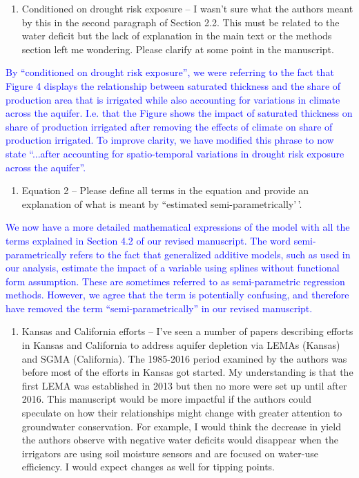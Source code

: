 \documentclass[
]{article}
\providecommand{\tightlist}{%
  \setlength{\itemsep}{0pt}\setlength{\parskip}{0pt}}
\begin{document}
\begin{enumerate}
\def\labelenumi{\arabic{enumi}.}
\setcounter{enumi}{2}
\tightlist
\item
  Conditioned on drought risk exposure -- I wasn't sure what the authors
  meant by this in the second paragraph of Section 2.2. This must be
  related to the water deficit but the lack of explanation in the main
  text or the methods section left me wondering. Please clarify at some
  point in the manuscript.
\end{enumerate}

\textcolor{blue}{By ``conditioned on drought risk exposure'', we were referring to the fact that Figure 4 displays the relationship between saturated thickness and the share of production area that is irrigated while also accounting for variations in climate across the aquifer. I.e. that the Figure shows the impact of saturated thickness on share of production irrigated after removing the effects of climate on share of production irrigated. To improve clarity, we have modified this phrase to now state ``...after accounting for spatio-temporal variations in drought risk exposure across the aquifer''.}

\begin{enumerate}
\def\labelenumi{\arabic{enumi}.}
\setcounter{enumi}{3}
\tightlist
\item
  Equation 2 -- Please define all terms in the equation and provide an
  explanation of what is meant by ``estimated semi-parametrically'\,'.
\end{enumerate}

\textcolor{blue}{We now have a more detailed mathematical expressions of the model with all the terms explained in Section 4.2 of our revised manuscript. The word semi-parametrically refers to the fact that generalized additive models, such as used in our analysis, estimate the impact of a variable using splines without functional form assumption. These are sometimes referred to as semi-parametric regression methods. However, we agree that the term is potentially confusing, and therefore have removed the term ``semi-parametrically'' in our revised manuscript.}

\begin{enumerate}
\def\labelenumi{\arabic{enumi}.}
\setcounter{enumi}{4}
\tightlist
\item
  Kansas and California efforts -- I've seen a number of papers
  describing efforts in Kansas and California to address aquifer
  depletion via LEMAs (Kansas) and SGMA (California). The 1985-2016
  period examined by the authors was before most of the efforts in
  Kansas got started. My understanding is that the first LEMA was
  established in 2013 but then no more were set up until after 2016.
  This manuscript would be more impactful if the authors could speculate
  on how their relationships might change with greater attention to
  groundwater conservation. For example, I would think the decrease in
  yield the authors observe with negative water deficits would disappear
  when the irrigators are using soil moisture sensors and are focused on
  water-use efficiency. I would expect changes as well for tipping
  points.
\end{enumerate}
\end{document}
